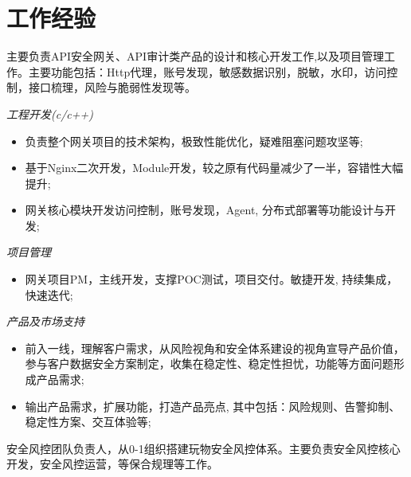 
\section{工作经验}
\vspace{0.2cm}


主要负责API安全网关、API审计类产品的设计和核心开发工作,以及项目管理工作。主要功能包括：Http代理，账号发现，敏感数据识别，脱敏，水印，访问控制，接口梳理，风险与脆弱性发现等。

\vspace{0.2cm}

\textit{工程开发(c/c++)}
\begin{itemize}
    \item 负责整个网关项目的技术架构，极致性能优化，疑难阻塞问题攻坚等;
    \item 基于Nginx二次开发，Module开发，较之原有代码量减少了一半，容错性大幅提升;
    \item 网关核心模块开发访问控制，账号发现，Agent, 分布式部署等功能设计与开发;
\end{itemize}

\textit{项目管理}
\begin{itemize}
\item 网关项目PM，主线开发，支撑POC测试，项目交付。敏捷开发, 持续集成，快速迭代;
\end{itemize}

\textit{产品及市场支持}
\begin{itemize}
    \item 前入一线，理解客户需求，从风险视角和安全体系建设的视角宣导产品价值，参与客户数据安全方案制定，收集在稳定性、稳定性担忧，功能等方面问题形成产品需求;
    \item 输出产品需求，扩展功能，打造产品亮点, 其中包括：风险规则、告警抑制、稳定性方案、交互体验等;
\end{itemize}

\vspace{0.2cm}
安全风控团队负责人，从0-1组织搭建玩物安全风控体系。主要负责安全风控核心开发，安全风控运营，等保合规理等工作。

